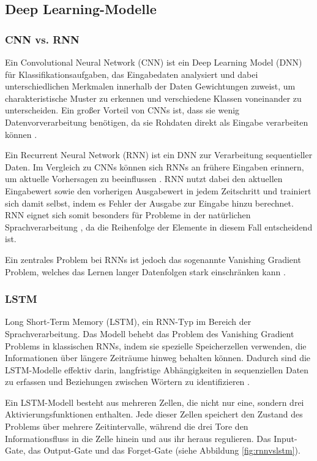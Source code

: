 \subsection{Deep Learning-Modelle}
\label{sec:deep_learning_modelle}

\subsubsection{CNN vs. RNN}

Ein Convolutional Neural Network (CNN) ist ein Deep Learning Model (DNN) für Klassifikationsaufgaben,
das Eingabedaten analysiert und dabei unterschiedlichen Merkmalen innerhalb der Daten Gewichtungen zuweist,
um charakteristische Muster zu erkennen und verschiedene Klassen voneinander zu unterscheiden.
Ein großer Vorteil von CNNs ist, dass sie wenig Datenvorverarbeitung benötigen, da sie Rohdaten direkt als Eingabe verarbeiten 
können \cite{aslam2022}.

Ein Recurrent Neural Network (RNN) ist ein DNN zur Verarbeitung sequentieller Daten.
Im Vergleich zu CNNs können sich RNNs an frühere Eingaben erinnern, um aktuelle Vorhersagen zu beeinflussen \cite{Deshai:2023aa}.
RNN nutzt dabei den aktuellen Eingabewert sowie den vorherigen Ausgabewert in jedem Zeitschritt 
und trainiert sich damit selbst, indem es Fehler der Ausgabe zur Eingabe hinzu berechnet.
RNN eignet sich somit besonders für Probleme in der natürlichen Sprachverarbeitung \cite{Wang:2020aa}, 
da die Reihenfolge der Elemente in diesem Fall entscheidend ist.

Ein zentrales Problem bei RNNs ist jedoch das sogenannte Vanishing Gradient Problem, welches das Lernen 
langer Datenfolgen stark einschränken kann \cite{aslam2022}.

\subsubsection{LSTM}

Long Short-Term Memory (LSTM), ein RNN-Typ im Bereich der Sprachverarbeitung. Das Modell behebt das Problem des 
Vanishing Gradient Problems in klassischen RNNs, indem sie spezielle Speicherzellen verwenden, die Informationen über 
längere Zeiträume hinweg behalten können.
Dadurch sind die LSTM-Modelle effektiv darin, langfristige Abhängigkeiten in sequenziellen Daten zu erfassen und
Beziehungen zwischen Wörtern zu identifizieren \cite{Deshai:2023aa}.

Ein LSTM-Modell besteht aus mehreren Zellen, die nicht nur eine, sondern drei Aktivierungsfunktionen enthalten.
Jede dieser Zellen speichert den Zustand des Problems über mehrere Zeitintervalle, während die drei Tore den 
Informationsfluss in die Zelle hinein und aus ihr heraus regulieren.
Das Input-Gate, das Output-Gate und das Forget-Gate \cite{berrajaa2022nlp} (siehe Abbildung \ref{fig:rnnvslstm}).

